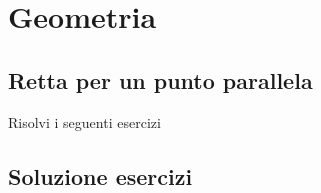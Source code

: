 \chapter{Geometria}
\section{Retta per un punto parallela}
Risolvi i seguenti esercizi
\tcbstartrecording
\tcbstoprecording
\newpage
\section{Soluzione esercizi}
\tcbinputrecords
